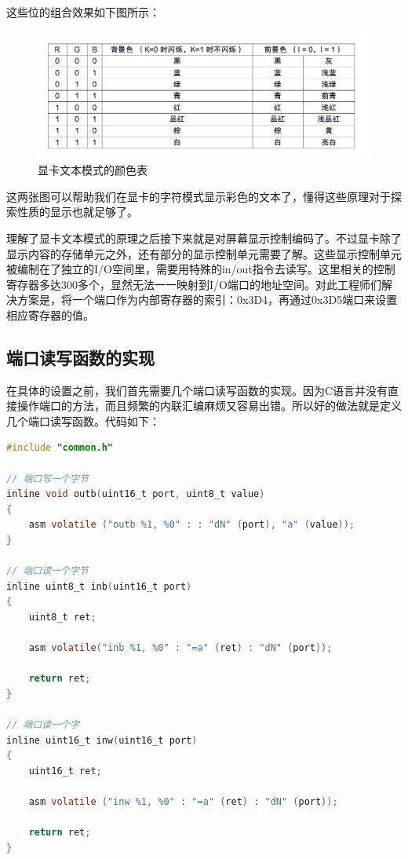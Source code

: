 \par 这些位的组合效果如下图所示：

\begin{figure}[ht]
      \centering
      \includegraphics[scale=0.4]{picture/chapt4/text_mode_color.png}
      \caption{显卡文本模式的颜色表}
\end{figure}

\par 这两张图可以帮助我们在显卡的字符模式显示彩色的文本了，懂得这些原理对于探索性质的显示也就足够了。

\par 理解了显卡文本模式的原理之后接下来就是对屏幕显示控制编码了。不过显卡除了显示内容的存储单元之外，还有部分的显示控制单元需要了解。这些显示控制单元被编制在了独立的I/O空间里，需要用特殊的in/out指令去读写。这里相关的控制寄存器多达300多个，显然无法一一映射到I/O端口的地址空间。对此工程师们解决方案是，将一个端口作为内部寄存器的索引：0x3D4，再通过0x3D5端口来设置相应寄存器的值。

\subsection{端口读写函数的实现}

\par 在具体的设置之前，我们首先需要几个端口读写函数的实现。因为C语言并没有直接操作端口的方法，而且频繁的内联汇编麻烦又容易出错。所以好的做法就是定义几个端口读写函数。代码如下：

\begin{lstlisting}[language = C, caption = libs/common.c]
#include "common.h"

// 端口写一个字节
inline void outb(uint16_t port, uint8_t value)
{
	asm volatile ("outb %1, %0" : : "dN" (port), "a" (value));
}

// 端口读一个字节
inline uint8_t inb(uint16_t port)
{
	uint8_t ret;

	asm volatile("inb %1, %0" : "=a" (ret) : "dN" (port));

	return ret;
}

// 端口读一个字
inline uint16_t inw(uint16_t port)
{
	uint16_t ret;

	asm volatile ("inw %1, %0" : "=a" (ret) : "dN" (port));

	return ret;
}
\end{lstlisting}


